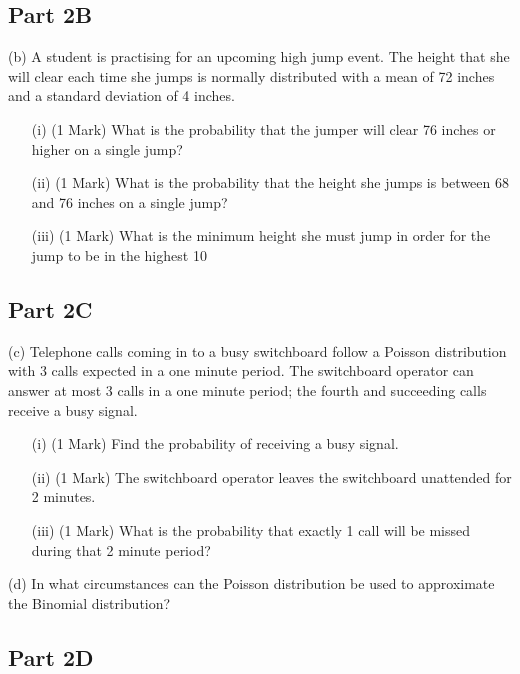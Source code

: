 \documentclass[]{article}
\begin{document}
\subsection*{Part 2B}
(b)	A student is practising for an upcoming high jump event.  The height that she will clear each time she jumps is normally distributed with a 
mean of 72 inches and a standard deviation of 4 inches.  
\begin{itemize}
\item[(i)] (1 Mark) 	What is the probability that the jumper will clear 76 inches or higher on a single jump?
\item[(ii)] (1 Mark) 	What is the probability that the height she jumps is between 68 and 76 inches on a single jump?
\item[(iii)] (1 Mark) 	What is the minimum height she must jump in order for the jump to be in the highest 10%
\end{itemize}
    

\subsection*{Part 2C}
(c)	Telephone calls coming in to a busy switchboard follow a Poisson distribution with 3 calls expected in a one minute period.  
The switchboard operator can answer at most 3 calls in a one minute period; the fourth and succeeding calls receive a busy signal.
\begin{itemize} 
\item[(i)] (1 Mark) 	   Find the probability of receiving a busy signal.
\item[(ii)] (1 Mark) 	   The switchboard operator leaves the switchboard unattended for 2 minutes.  
\item[(iii)] (1 Mark) What is the probability that exactly 1 call will be missed during that 2 minute period?
\end{itemize}       

(d)	In what circumstances can the Poisson distribution be used to approximate the Binomial distribution?
      


\subsection*{Part 2D}
\end{document}
